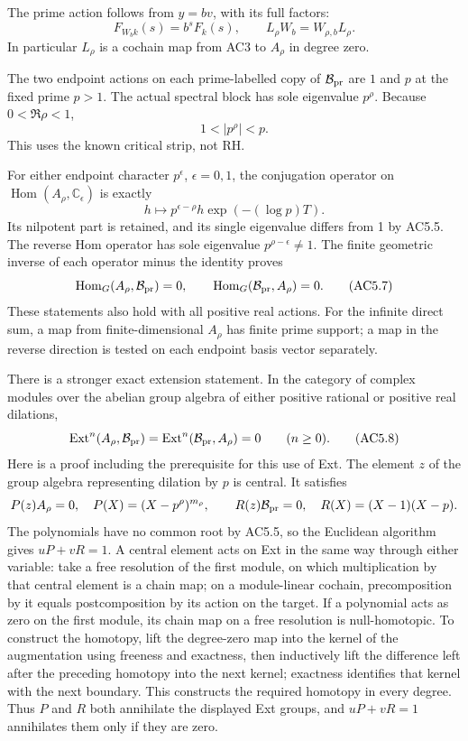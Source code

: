 The prime action follows from \(y=bv\), with its full factors: \[
 F_{W_bk}(s)=b^sF_k(s),\qquad
 L_\rho W_b=W_{\rho,b}L_\rho.
\tag{AC5.4}
\] In particular \(L_\rho\) is a cochain map from AC3 to \(A_\rho\) in
degree zero.

The two endpoint actions on each prime-labelled copy of
\(\mathcal B_{\rm pr}\) are \(1\) and \(p\) at the fixed prime \(p>1\).
The actual spectral block has sole eigenvalue \(p^\rho\). Because
\(0<\Re\rho<1\), \[
 1<|p^\rho|<p.
\tag{AC5.5}
\] This uses the known critical strip, not RH.

For either endpoint character \(p^\epsilon\), \(\epsilon=0,1\), the
conjugation operator on
\(\operatorname{Hom}(A_\rho,\mathbb C_\epsilon)\) is exactly \[
 h\longmapsto p^{\epsilon-\rho}h\exp(-(\log p)T).
\tag{AC5.6}
\] Its nilpotent part is retained, and its single eigenvalue differs
from 1 by AC5.5. The reverse Hom operator has sole eigenvalue
\(p^{\rho-\epsilon}\ne1\). The finite geometric inverse of each operator
minus the identity proves \[
 \operatorname{Hom}_G(A_\rho,\mathcal B_{\rm pr})=0,\qquad
 \operatorname{Hom}_G(\mathcal B_{\rm pr},A_\rho)=0.
\tag{AC5.7}
\] These statements also hold with all positive real actions. For the
infinite direct sum, a map from finite-dimensional \(A_\rho\) has finite
prime support; a map in the reverse direction is tested on each endpoint
basis vector separately.

There is a stronger exact extension statement. In the category of
complex modules over the abelian group algebra of either positive
rational or positive real dilations, \[
 \operatorname{Ext}^{n}(A_\rho,\mathcal B_{\rm pr})=
 \operatorname{Ext}^{n}(\mathcal B_{\rm pr},A_\rho)=0
 \qquad(n\geq0).
\tag{AC5.8}
\] Here is a proof including the prerequisite for this use of Ext. The
element \(z\) of the group algebra representing dilation by \(p\) is
central. It satisfies \[
 P(z)A_\rho=0,\quad P(X)=(X-p^\rho)^{m_\rho},
 \qquad
 R(z)\mathcal B_{\rm pr}=0,\quad R(X)=(X-1)(X-p).
\] The polynomials have no common root by AC5.5, so the Euclidean
algorithm gives \(uP+vR=1\). A central element acts on Ext in the same
way through either variable: take a free resolution of the first module,
on which multiplication by that central element is a chain map; on a
module-linear cochain, precomposition by it equals postcomposition by
its action on the target. If a polynomial acts as zero on the first
module, its chain map on a free resolution is null-homotopic. To
construct the homotopy, lift the degree-zero map into the kernel of the
augmentation using freeness and exactness, then inductively lift the
difference left after the preceding homotopy into the next kernel;
exactness identifies that kernel with the next boundary. This constructs
the required homotopy in every degree. Thus \(P\) and \(R\) both
annihilate the displayed Ext groups, and \(uP+vR=1\) annihilates them
only if they are zero.

